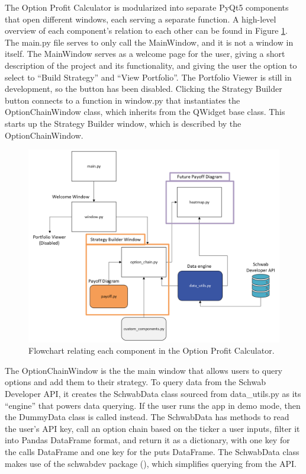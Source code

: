 \documentclass{article}
\begin{document}
\indent The Option Profit Calculator is modularized into separate PyQt5 components that open different windows, each serving a separate function. A high-level overview of each component's relation to each other can be found in Figure \ref{fig:Figure 6}. The main.py file serves to only call the MainWindow, and it is not a window in itself. The MainWindow serves as a welcome page for the user, giving a short description of the project and its functionality, and giving the user the option to select to \enquote{Build Strategy} and \enquote{View Portfolio}. The Portfolio Viewer is still in development, so the button has been disabled. Clicking the Strategy Builder button connects to a function in window.py that instantiates the OptionChainWindow class, which inherits from the QWidget base class. This starts up the Strategy Builder window, which is described by the OptionChainWindow. 

\begin{figure}
    \begin{center}
    \includegraphics[width=\textwidth,height=\textheight,keepaspectratio]{assets/opc-diagram.png}
    \caption{\label{fig:Figure 6}Flowchart relating each component in the Option Profit Calculator.}
    \end{center}
\end{figure}

\indent The OptionChainWindow is the the main window that allows users to query options and add them to their strategy. To query data from the Schwab Developer API, it creates the SchwabData class sourced from data\_utils.py as its \enquote{engine} that powers data querying. If the user runs the app in demo mode, then the DummyData class is called instead. The SchwabData has methods to read the user's API key, call an option chain based on the ticker a user inputs, filter it into Pandas DataFrame format, and return it as a dictionary, with one key for the calls DataFrame and one key for the puts DataFrame. The SchwabData class makes use of the schwabdev package (\cite{schwabdev}), which simplifies querying from the API. 
\end{document}
